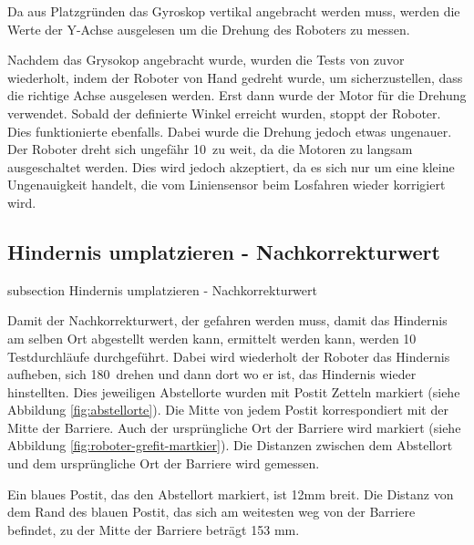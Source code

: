 Da aus Platzgründen das Gyroskop vertikal angebracht werden muss, werden die Werte der Y-Achse ausgelesen um die Drehung des Roboters zu messen.

Nachdem das Grysokop angebracht wurde, wurden die Tests von zuvor wiederholt, indem der Roboter von Hand gedreht wurde, um sicherzustellen, dass die richtige Achse ausgelesen werden. Erst dann wurde der Motor für die Drehung verwendet. Sobald der definierte Winkel erreicht wurden, stoppt der Roboter. Dies funktionierte ebenfalls. Dabei wurde die Drehung jedoch etwas ungenauer. Der Roboter dreht sich ungefähr 10\textdegree \ zu weit, da die Motoren zu langsam ausgeschaltet werden. Dies wird jedoch akzeptiert, da es sich nur um eine kleine Ungenauigkeit handelt, die vom Liniensensor beim Losfahren wieder korrigiert wird.


\newpage
\subsection*{Hindernis umplatzieren - Nachkorrekturwert}\label{hindernis-nachkorrektur}
    {subsection}
    {Hindernis umplatzieren - Nachkorrekturwert}

Damit der Nachkorrekturwert, der gefahren werden muss, damit das Hindernis am selben Ort abgestellt werden kann, ermittelt werden kann, werden 10 Testdurchläufe durchgeführt. Dabei wird wiederholt der Roboter das Hindernis aufheben, sich 180\textdegree \ drehen und dann dort wo er ist, das Hindernis wieder hinstellten. Dies jeweiligen Abstellorte wurden mit Postit Zetteln markiert (siehe Abbildung \ref{fig:abstellorte}). Die Mitte von jedem Postit korrespondiert mit der Mitte der Barriere. Auch der ursprüngliche Ort der Barriere wird markiert (siehe Abbildung \ref{fig:roboter-grefit-martkier}). Die Distanzen zwischen dem Abstellort und dem ursprüngliche Ort der Barriere wird gemessen. 

Ein blaues Postit, das den Abstellort markiert, ist 12mm breit. Die Distanz von dem Rand des blauen Postit, das sich am weitesten weg von der Barriere befindet, zu der Mitte der Barriere beträgt 153 mm.

